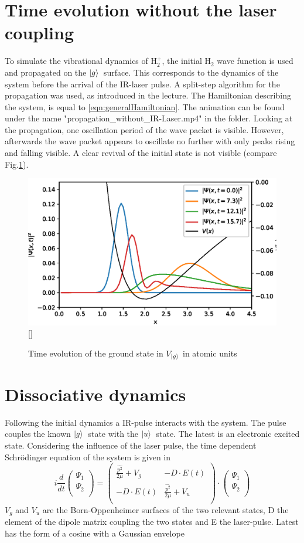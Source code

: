 \documentclass[12pt]{article}
\newcommand{\gr}{$\ket{g}$}
\newcommand{\us}{$\ket{u}$}
\newcommand{\psiv}{\begin{pmatrix}\Psi_1\\ \Psi_2\\ \end{pmatrix}}
\begin{document}
\section{Time evolution without the laser coupling}
To simulate the vibrational dynamics of H$_2^+$, the initial H$_2$ wave function is used and propagated on the \gr\ surface. This corresponds to the dynamics of the system before the arrival of the IR-laser pulse. A split-step algorithm for the propagation was used, as introduced in the lecture. The Hamiltonian describing the system, is equal to \eqref{eqn:generalHamiltonian}.
The animation can be found under the name "propagation\_without\_IR-Laser.mp4"
in the folder.
Looking at the propagation, one oscillation period of the wave packet is visible. However, afterwards the wave packet appears to oscillate no further with only peaks rising and falling visible. A clear revival of the initial state is not visible (compare Fig.\ref{fig:withoutIR}).
\begin{figure}[H]
    \centering
    \includegraphics[width=1\textwidth]{woIR.eps}[]
    \caption{Time evolution of the ground state in $V_{\ket{g}}$ in atomic units}\label{fig:withoutIR}
\end{figure}


\section{Dissociative dynamics}
Following the initial dynamics a IR-pulse interacts with the system. The pulse couples  the known \gr \ state with the \us \ state. The latest is an electronic excited state. Considering the influence of the laser pulse, the time dependent Schr\"odinger equation of the system is given in \cite{PhysRevA.93.012507}
\begin{equation}\label{eqn:dissociativeDyn}
i
\frac{d}{dt}
\psiv
=
\begin{pmatrix}
\frac{\hat{p^2}}{2\mu}+V_g & -D\cdot E(t)\\
-D\cdot E(t) & \frac{\hat{p^2}}{2\mu}+V_u\\
\end{pmatrix}
\cdot
\psiv
\end{equation}
$V_g$ and $V_u$ are the Born-Oppenheimer surfaces of the two relevant states, D the element of the dipole matrix coupling the two states and E the laser-pulse.
Latest has the form of a cosine with a Gaussian envelope
\end{document}
